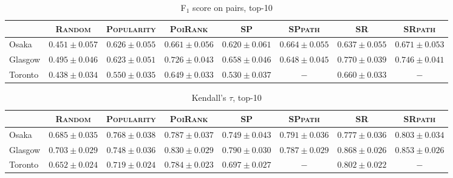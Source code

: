 \begin{table*}[t]
\caption{F$_1$ score on pairs, top-10}
\centering
\small
\setlength{\tabcolsep}{4pt} %
\begin{tabular}{l|cc|cc|ccc} \hline
 & \textsc{Random} & \textsc{Popularity} & \textsc{PoiRank} & \textsc{SP} & \textsc{SPpath} & \textsc{SR} & \textsc{SRpath} \\ \hline
Osaka & $0.451\pm0.057$ & $0.626\pm0.055$ & $0.661\pm0.056$ & $0.620\pm0.061$ & $\mathit{0.664\pm0.055}$ & $0.637\pm0.055$ & $\mathbf{0.671\pm0.053}$ \\
Glasgow & $0.495\pm0.046$ & $0.623\pm0.051$ & $0.726\pm0.043$ & $0.658\pm0.046$ & $0.648\pm0.045$ & $\mathbf{0.770\pm0.039}$ & $\mathit{0.746\pm0.041}$ \\
Toronto & $0.438\pm0.034$ & $0.550\pm0.035$ & $\mathit{0.649\pm0.033}$ & $0.530\pm0.037$ & $-$ & $\mathbf{0.660\pm0.033}$ & $-$ \\
\hline
\end{tabular}
\end{table*}

\begin{table*}[t]
\caption{Kendall's $\tau$, top-10}
\centering
\small
\setlength{\tabcolsep}{4pt} %
\begin{tabular}{l|cc|cc|ccc} \hline
 & \textsc{Random} & \textsc{Popularity} & \textsc{PoiRank} & \textsc{SP} & \textsc{SPpath} & \textsc{SR} & \textsc{SRpath} \\ \hline
Osaka & $0.685\pm0.035$ & $0.768\pm0.038$ & $0.787\pm0.037$ & $0.749\pm0.043$ & $\mathit{0.791\pm0.036}$ & $0.777\pm0.036$ & $\mathbf{0.803\pm0.034}$ \\
Glasgow & $0.703\pm0.029$ & $0.748\pm0.036$ & $0.830\pm0.029$ & $0.790\pm0.030$ & $0.787\pm0.029$ & $\mathbf{0.868\pm0.026}$ & $\mathit{0.853\pm0.026}$ \\
Toronto & $0.652\pm0.024$ & $0.719\pm0.024$ & $\mathit{0.784\pm0.023}$ & $0.697\pm0.027$ & $-$ & $\mathbf{0.802\pm0.022}$ & $-$ \\
\hline
\end{tabular}
\end{table*}

